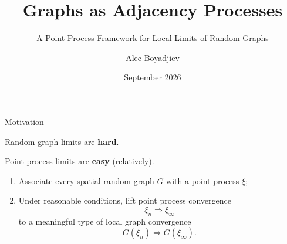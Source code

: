 \documentclass[aspectratio=169]{beamer}
\title{Graphs as Adjacency Processes}
\subtitle{A Point Process Framework for Local Limits of Random Graphs}
\author{Alec Boyadjiev}
\institute{
University of Amsterdam (UvA)\\[0.5em]
Based on bachelor thesis work at TU/e;\\
Upcoming joint work with Pim van der Hoorn
}
\date{September 2026}
\begin{document}
\begin{frame}
    \titlepage
\end{frame}

\begin{frame}{Motivation}

Random graph limits are \textbf{hard}.

\vspace{0.4em}

Point process limits are \textbf{easy} (relatively).

\vspace{1em}

\begin{enumerate}
    \item Associate every spatial random graph $G$ with a point process $\xi$;

    \vspace{0.3em}

    \item Under reasonable conditions, lift point process convergence
    \[
        \xi_n \Rightarrow \xi_\infty
    \]
    to a meaningful type of local graph convergence
    \[
        G(\xi_n) \Rightarrow G(\xi_\infty).
    \]
\end{enumerate}

\end{frame}
\end{document}
